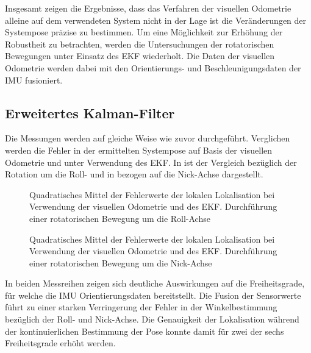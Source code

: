 Insgesamt zeigen die Ergebnisse, dass das Verfahren der visuellen Odometrie alleine auf dem verwendeten System nicht in der Lage ist die Veränderungen der Systempose präzise zu bestimmen. Um eine Möglichkeit zur Erhöhung der Robustheit zu betrachten, werden die Untersuchungen der rotatorischen Bewegungen unter Einsatz des EKF wiederholt. Die Daten der visuellen Odometrie werden dabei mit den Orientierungs- und Beschleunigungsdaten der IMU fusioniert.

\subsection{Erweitertes Kalman-Filter}
Die Messungen werden auf gleiche Weise wie zuvor durchgeführt. Verglichen werden die Fehler in der ermittelten Systempose auf Basis der visuellen Odometrie und unter Verwendung des EKF. In  ist der Vergleich bezüglich der Rotation um die Roll- und in  bezogen auf die Nick-Achse dargestellt.\\


\begin{figure}[!ht]

\caption{Quadratisches Mittel der Fehlerwerte der lokalen Lokalisation bei Verwendung der visuellen Odometrie und des EKF. Durchführung einer rotatorischen Bewegung um die Roll-Achse}
\label{fig.loc_loc_rot_ekf_roll}
\end{figure}%

\begin{figure}[!ht]

\caption{Quadratisches Mittel der Fehlerwerte der lokalen Lokalisation bei Verwendung der visuellen Odometrie und des EKF. Durchführung einer rotatorischen Bewegung um die Nick-Achse}
\label{fig.loc_loc_rot_ekf_pitch}
\end{figure}


In beiden Messreihen zeigen sich deutliche Auswirkungen auf die Freiheitsgrade, für welche die IMU Orientierungsdaten bereitstellt. Die Fusion der Sensorwerte führt zu einer starken Verringerung der Fehler in der Winkelbestimmung bezüglich der Roll- und Nick-Achse. Die Genauigkeit der Lokalisation während der kontinuierlichen Bestimmung der Pose konnte damit für zwei der sechs Freiheitsgrade erhöht werden.\\

